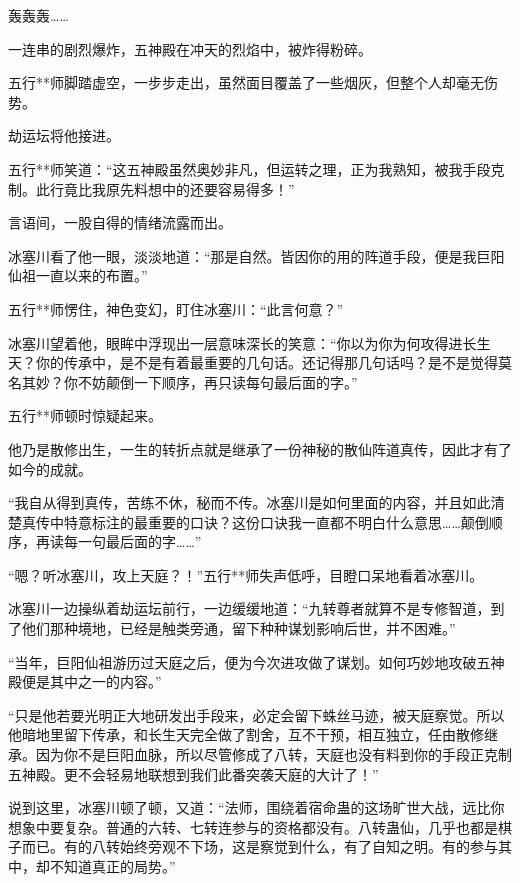
\begin{this_body}

轰轰轰……

一连串的剧烈爆炸，五神殿在冲天的烈焰中，被炸得粉碎。

五行**师脚踏虚空，一步步走出，虽然面目覆盖了一些烟灰，但整个人却毫无伤势。

劫运坛将他接进。

五行**师笑道：“这五神殿虽然奥妙非凡，但运转之理，正为我熟知，被我手段克制。此行竟比我原先料想中的还要容易得多！”

言语间，一股自得的情绪流露而出。

冰塞川看了他一眼，淡淡地道：“那是自然。皆因你的用的阵道手段，便是我巨阳仙祖一直以来的布置。”

五行**师愣住，神色变幻，盯住冰塞川：“此言何意？”

冰塞川望着他，眼眸中浮现出一层意味深长的笑意：“你以为你为何攻得进长生天？你的传承中，是不是有着最重要的几句话。还记得那几句话吗？是不是觉得莫名其妙？你不妨颠倒一下顺序，再只读每句最后面的字。”

五行**师顿时惊疑起来。

他乃是散修出生，一生的转折点就是继承了一份神秘的散仙阵道真传，因此才有了如今的成就。

“我自从得到真传，苦练不休，秘而不传。冰塞川是如何里面的内容，并且如此清楚真传中特意标注的最重要的口诀？这份口诀我一直都不明白什么意思……颠倒顺序，再读每一句最后面的字……”

“嗯？听冰塞川，攻上天庭？！”五行**师失声低呼，目瞪口呆地看着冰塞川。

冰塞川一边操纵着劫运坛前行，一边缓缓地道：“九转尊者就算不是专修智道，到了他们那种境地，已经是触类旁通，留下种种谋划影响后世，并不困难。”

“当年，巨阳仙祖游历过天庭之后，便为今次进攻做了谋划。如何巧妙地攻破五神殿便是其中之一的内容。”

“只是他若要光明正大地研发出手段来，必定会留下蛛丝马迹，被天庭察觉。所以他暗地里留下传承，和长生天完全做了割舍，互不干预，相互独立，任由散修继承。因为你不是巨阳血脉，所以尽管修成了八转，天庭也没有料到你的手段正克制五神殿。更不会轻易地联想到我们此番突袭天庭的大计了！”

说到这里，冰塞川顿了顿，又道：“法师，围绕着宿命蛊的这场旷世大战，远比你想象中要复杂。普通的六转、七转连参与的资格都没有。八转蛊仙，几乎也都是棋子而已。有的八转始终旁观不下场，这是察觉到什么，有了自知之明。有的参与其中，却不知道真正的局势。”


\end{this_body}
